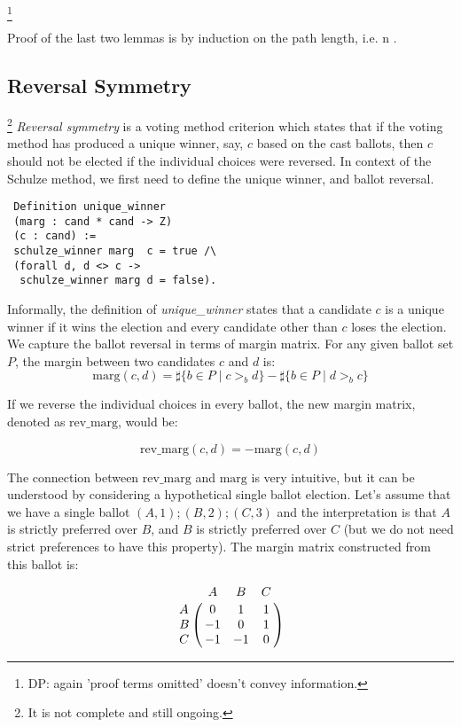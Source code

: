 \documentclass[compsoc,conference,a4paper,10pt,times]{IEEEtran}
\begin{document}
 \footnote{DP: again 'proof terms omitted' doesn't convey
 information.}

Proof of the last two lemmas is by induction on the path length, i.e. n \cite{Carre:1971:ANR}. 


\subsection{Reversal Symmetry}\footnote{It is not complete and still ongoing.}
 \textit{Reversal symmetry} is a voting method criterion which states that if the
 voting method has produced a unique 
  winner, say, $c$ based on the cast ballots, then $c$ should not be elected if the 
 individual choices were reversed. 
 In context of the Schulze method, we first need to define the unique winner, and ballot reversal. 
 
 \begin{verbatim}
 Definition unique_winner 
 (marg : cand * cand -> Z) 
 (c : cand) :=
 schulze_winner marg  c = true /\
 (forall d, d <> c -> 
  schulze_winner marg d = false).
\end{verbatim}  
\noindent
Informally, the definition of \textit{unique\_winner} states that a 
candidate $c$ is a unique winner
if it wins the election and every candidate 
other than $c$ loses the election.
We capture the ballot reversal in terms of margin matrix. For any given ballot set $P$, 
the margin between two candidates $c$ and $d$ is: 
\[
  \mathrm{marg}(c, d) = \sharp \lbrace b \in P \mid c >_b d \rbrace -
            \sharp \lbrace b \in P \mid d >_b c \rbrace
\] 

\noindent
If we reverse the individual choices in every ballot, the new margin
matrix, denoted as $\mathrm{rev\_marg}$, would be:

\[
  \mathrm{rev\_marg}(c, d) = -  \mathrm{marg} (c, d)  
\]    

\noindent
The connection between $\mathrm{rev\_marg}$ and $\mathrm{marg}$ is very intuitive, but it can be understood 
by considering a hypothetical single ballot election. Let's assume that we have 
a single ballot $(A, 1); (B, 2); (C, 3)$ and the interpretation is 
that $A$ is strictly preferred over $B$, and $B$ is strictly preferred over $C$ 
(but we do not need strict preferences to have this property).  The margin matrix
constructed from this ballot is: 

\[
\bordermatrix{ & A & B & C \cr
      A & 0 & 1 & 1 \cr
      B & -1 & 0 & 1 \cr
      C & -1 & -1 & 0 }
      \]
    
\end{document}
